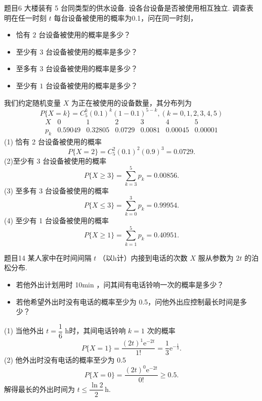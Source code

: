 \begin{question}{题目6}
    大楼装有 5 台同类型的供水设备. 设各台设备是否被使用相互独立. 调查表明在任一时刻 $t$ 每台设备被使用的概率为0.1，问在同一时刻，
    \begin{itemize}
        \item [(1)] 恰有 $2$ 台设备被使用的概率是多少？
        \item [(2)] 至少有 $3$ 台设备被使用的概率是多少？
        \item [(3)] 至多有 $3$ 台设备被使用的概率是多少？
        \item [(4)] 至少有 $1$ 台设备被使用的概率是多少？
    \end{itemize}
\end{question}
\begin{solution}
    我们约定随机变量 $X$ 为正在被使用的设备数量，其分布列为
    $$
        P\{X = k\} = C_5^k(0.1)^k(1-0.1)^{5-k},(k = 0, 1, 2, 3, 4, 5)
    $$
    $$
        \begin{array}{c|cccccc}
            X   & 0       & 1       & 2      & 3      & 4       & 5       \\
            \hline
            p_k & 0.59049 & 0.32805 & 0.0729 & 0.0081 & 0.00045 & 0.00001
        \end{array}
    $$
    (1) 恰有 2 台设备被使用的概率
    $$
        P\{X=2\} = C_5^2(0.1)^2(0.9)^3 = 0.0729.
    $$
    (2)至少有 3 台设备被使用的概率
    $$
        P\{X \geqslant 3\} = \sum_{k=3}^5 p_k = 0.00856.
    $$
    (3) 至多有 3 台设备被使用的概率
    $$
        P\{X \leqslant 3\} = \sum_{k=0}^3 p_k = 0.99954.
    $$
    (4) 至少有 1 台设备被使用的概率
    $$
        P\{X \geqslant 1\} = \sum_{k=1}^5 p_k = 0.40951.
    $$
\end{solution}

\begin{question}{题目14}
    某人家中在时间间隔 $t$ （以h计）内接到电话的次数 $X$ 服从参数为 $2t$ 的泊松分布.
    \begin{itemize}
        \item [(1)] 若他外出计划用时 10min ，问其间有电话铃响一次的概率是多少？
        \item [(2)] 若他希望外出时没有电话的概率至少为 0.5，问他外出应控制最长时间是多少？
    \end{itemize}
\end{question}
\begin{solution}
    (1) 当他外出 $t = \dfrac{1}{6}$ h时，其间电话铃响 $k=1$ 次的概率
    $$
        P\{X=1\} = \frac{(2t)^1\mathrm{e}^{-2t}}{1!}
        = \frac{1}{3}\mathrm{e}^{-\frac{1}{3}}.
    $$
    (2) 他外出时没有电话的概率至少为 0.5
    $$
        P\{X=0\} = \frac{(2t)^0\mathrm{e}^{-2t}}{0!} \geqslant 0.5.
    $$
    解得最长的外出时间为 $t \leqslant \dfrac{\ln2}{2} \,\mathrm{h}$.
\end{solution}


